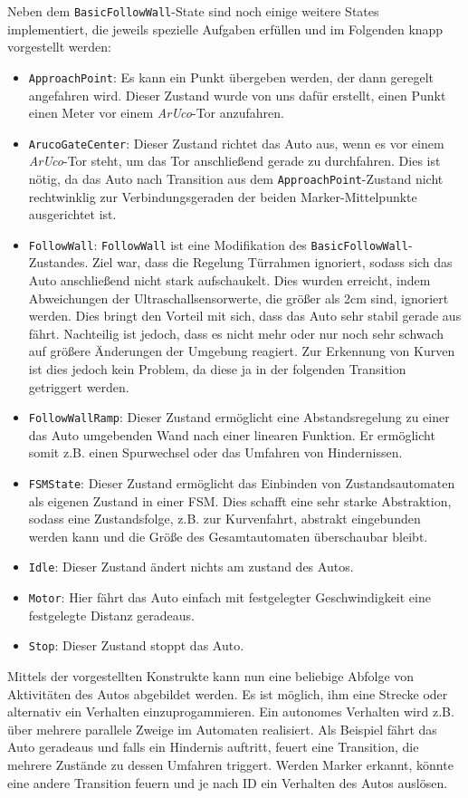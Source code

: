 Neben dem \texttt{BasicFollowWall}-State sind noch einige weitere States implementiert, die jeweils spezielle Aufgaben erfüllen und im Folgenden knapp vorgestellt werden:
\begin{itemize}
	\item \texttt{ApproachPoint}: Es kann ein Punkt übergeben werden, der dann geregelt angefahren wird. Dieser Zustand wurde von uns dafür erstellt, einen Punkt einen Meter vor einem \textit{ArUco}-Tor anzufahren.
	\item \texttt{ArucoGateCenter}: Dieser Zustand richtet das Auto aus, wenn es vor einem \textit{ArUco}-Tor steht, um das Tor anschließend gerade zu durchfahren. Dies ist nötig, da das Auto nach Transition aus dem \texttt{ApproachPoint}-Zustand nicht rechtwinklig zur Verbindungsgeraden der beiden Marker-Mittelpunkte ausgerichtet ist.
	\item \texttt{FollowWall}: \texttt{FollowWall} ist eine Modifikation des \texttt{BasicFollowWall}-Zustandes. Ziel war, dass die Regelung Türrahmen ignoriert, sodass sich das Auto anschließend nicht stark aufschaukelt. Dies wurden erreicht, indem Abweichungen der Ultraschallsensorwerte, die größer als 2cm sind, ignoriert werden. Dies bringt den Vorteil mit sich, dass das Auto sehr stabil gerade aus fährt. Nachteilig ist jedoch, dass es nicht mehr oder nur noch sehr schwach auf größere Änderungen der Umgebung reagiert. Zur Erkennung von Kurven ist dies jedoch kein Problem, da diese ja in der folgenden Transition getriggert werden.
	\item \texttt{FollowWallRamp}: Dieser Zustand ermöglicht eine Abstandsregelung zu einer das Auto umgebenden Wand nach einer linearen Funktion. Er ermöglicht somit z.B. einen Spurwechsel oder das Umfahren von Hindernissen.
	\item \texttt{FSMState}: Dieser Zustand ermöglicht das Einbinden von Zustandsautomaten als eigenen Zustand in einer FSM. Dies schafft eine sehr starke Abstraktion, sodass eine Zustandsfolge, z.B. zur Kurvenfahrt, abstrakt eingebunden werden kann und die Größe des Gesamtautomaten überschaubar bleibt.
	\item \texttt{Idle}: Dieser Zustand ändert nichts am zustand des Autos. 
	\item \texttt{Motor}: Hier fährt das Auto einfach mit festgelegter Geschwindigkeit eine festgelegte Distanz geradeaus.
	\item \texttt{Stop}: Dieser Zustand stoppt das Auto.
\end{itemize}
Mittels der vorgestellten Konstrukte kann nun eine beliebige Abfolge von Aktivitäten des Autos abgebildet werden. Es ist möglich, ihm eine Strecke oder alternativ ein Verhalten einzuprogammieren. Ein autonomes Verhalten wird z.B. über mehrere parallele Zweige im Automaten realisiert. Als Beispiel fährt das Auto geradeaus und falls ein Hindernis auftritt, feuert eine Transition, die mehrere Zustände zu dessen Umfahren triggert. Werden Marker erkannt, könnte eine andere Transition feuern und je nach ID ein Verhalten des Autos auslösen.

